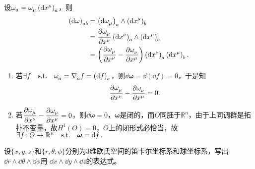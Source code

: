 \begin{xiti}
	\begin{zm}
		设$\tensor{\omega}{_a} = \tensor{\omega}{_\mu} \tensor{\left(\dd{x^\mu}\right)}{_a} $，则
		\begin{align*}
		\tensor{\left(\dd{\omega}\right)}{_{ab}} &= \tensor{\left( \dd{\tensor{\omega}{_\mu}} \right)}{_a} \wedge \tensor{\left(\dd{x^\mu}\right)}{_{b}}\\
		&= \pdv{\tensor{\omega}{_\mu}}{x^\nu} \tensor{\left(\dd{x^\nu}\right)}{_a} \wedge \tensor{\left(\dd{x^\mu}\right)}{_b}\\
		&= \left( \pdv{\tensor{\omega}{_\mu}}{x^\nu} - \pdv{\tensor{\omega}{_\nu}}{x^\mu} \right) \tensor{\left(\dd{x^\nu}\right)}{_a} \tensor{\left(\dd{x^\mu}\right)}{_b}.
		\end{align*}
		\begin{enumerate}
			\item 若$\exists f\qq{s.t.} \tensor{\omega}{_a} = \Nabla{a} f=\tensor{\left(\dd{f}\right)}{_a} $，则$\dd{\bm{\omega}} = \dd(\dd{f})=0 $，于是知\[\pdv{\tensor{\omega}{_\mu}}{x^\nu} - \pdv{\tensor{\omega}{_\nu}}{x^\mu}=0. \]
			\item 若$\displaystyle \pdv{\tensor{\omega}{_\mu}}{x^\nu} - \pdv{\tensor{\omega}{_\nu}}{x^\mu}=0 $，则$\dd{\bm{\omega}}=0 $，$\bm{\omega}$是闭的，而$O$同胚于$\mathbb{R}^n$，由于上同调群是拓扑不变量，故$H^1 (O)={0} $，$O$上的闭形式必恰当，故$\exists f\colon O\rightarrow \mathbb{R}^n \qq{s.t.} \bm{\omega} = \dd{f}. $
		\end{enumerate}
	\end{zm}
	
	\item 设$ \{ x,y,z \} $和$\{r,\theta,\phi \} $分别为3维欧氏空间的笛卡尔坐标系和球坐标系，写出$ \dd{r} \wedge \dd{\theta} \wedge \dd{\phi} $用 $\dd{x} \wedge \dd{y} \wedge \dd{z} $的表达式。
	

\end{xiti}
